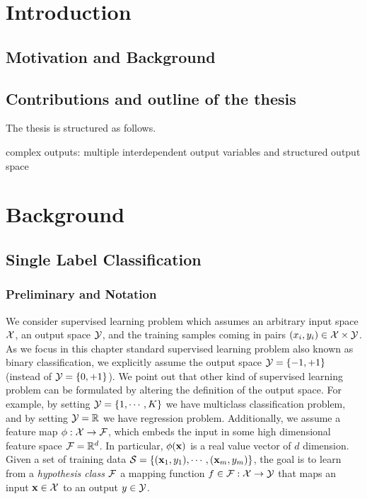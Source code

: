 


\chapter{Introduction}
\section{Motivation and Background}
\section{Contributions and outline of the thesis}

The thesis is structured as follows.


complex outputs: multiple interdependent output variables and structured output space


\chapter{Background}

\newpage
\section{Single Label Classification}

\subsection{Preliminary and Notation}
We consider supervised learning problem which assumes an arbitrary input space $\mathcal{X}$, an output space $\mathcal{Y}$, and the training samples coming in pairs $(x_i,y_i)\in\mathcal{X}\times\mathcal{Y}$.
As we focus in this chapter standard supervised learning problem also known as binary classification, we explicitly assume the output space $\mathcal{Y}=\{-1,+1\}$ (instead of $\mathcal{Y}=\{0,+1\}$).
We point out that other kind of supervised learning problem can be formulated by altering the definition of the output space.
For example, by setting $\mathcal{Y}=\{1,\cdots,K\}$ we have multiclass classification problem, and by setting $\mathcal{Y}=\mathbb{R}$ we have regression problem.
Additionally, we assume a feature map $\mathbf{\phi}:\mathcal{X}\rightarrow\mathcal{F}$, which embeds the input in some high dimensional feature space $\mathcal{F}=\mathbb{R}^d$.
In particular, $\mathbf{\phi}(\mathbf {x})$ is a real value vector of $d$ dimension.
Given a set of training data $\mathcal{S}=\{(\mathbf {x}_1,y_1),\cdots,(\mathbf {x}_m,y_m)\}$, the goal is to learn from a \textit{hypothesis class} $\mathcal{F}$ a mapping function $f\in\mathcal{F}:\mathcal{X}\rightarrow\mathcal{Y}$  that maps an input $\mathbf {x}\in\mathcal{X}$ to an output $y\in\mathcal{Y}$. 

